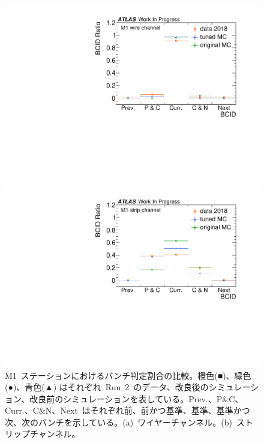 \begin{figure}[tbp]
	\begin{minipage}{0.49\hsize}
	\centering
	\includegraphics[width=\textwidth,page=1]{img/rec/M1wire.pdf}
	\subcaption{}
	\end{minipage}
	\begin{minipage}{0.49\hsize}
	\centering
	\includegraphics[width=\textwidth,page=1]{img/rec/M1strip.pdf}
	\subcaption{}
	\end{minipage}
	\caption[M1~ステーションにおけるバンチ判定割合の比較]{M1~ステーションにおけるバンチ判定割合の比較。橙色(■)、緑色(●)、青色(▲) はそれぞれ~Run~2~のデータ、改良後のシミュレーション、改良前のシミュレーションを表している。Prev.、P$\&$C、Curr.、C$\&$N、Next~はそれぞれ前、前かつ基準、基準、基準かつ次、次のバンチを示している。(a)~ワイヤーチャンネル。(b)~ストリップチャンネル。}
	\label{fig:M1bcid}
\end{figure}
